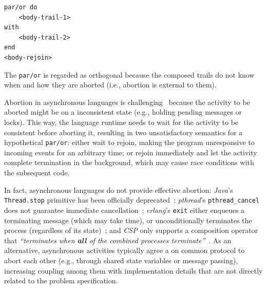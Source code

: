 \documentclass{acm_proc_article-sp}
\newcommand{\code}[1] {{\small{\texttt{#1}}}}
\newcommand{\1}{\;}
\newcommand{\2}{\;\;}
\newcommand{\3}{\;\;\;}
\newcommand{\5}{\;\;\;\;\;}
\begin{document}
\begin{lstlisting}
par/or do
    <body-trail-1>
with
    <body-trail-2>
end
<body-rejoin>
\end{lstlisting}

The \code{par/or} is regarded as orthogonal because the composed trails do not 
know when and how they are aborted (i.e., abortion is external to them).
%


Abortion in asynchronous languages is challenging~\cite{esterel.preemption} 
because the activity to be aborted might be on a inconsistent state (e.g., 
holding pending messages or locks).
%
This way, the language runtime needs to wait for the activity to be consistent 
before aborting it, resulting in two unsatisfactory semantics for a 
hypothetical \code{par/or}:
either wait to rejoin, making the program unresponsive to incoming events for 
an arbitrary time;
or rejoin immediately and let the activity complete termination in the 
background, which may cause race conditions with the subsequent code.

In fact, asynchronous languages do not provide effective abortion:
\emph{Java}'s \code{Thread.stop} primitive has been officially 
deprecated~\cite{sync_async.threadsstop};
\emph{pthread}'s \code{pthread\_cancel} does not guarantee immediate 
cancellation~\cite{sync_async.pthreadsstop};
\emph{erlang}'s \code{exit} either enqueues a terminating message (which may 
take time), or unconditionally terminates the process (regardless of its 
state)~\cite{sync_async.erlangstop};
and \emph{CSP} only supports a composition operator that \emph{``terminates 
when \textbf{all} of the combined processes terminate''}~\cite{async.csp}.
%
As an alternative, asynchronous activities typically agree a on common protocol 
to abort each other (e.g., through shared state variables or message passing), 
increasing coupling among them with implementation details that are not 
directly related to the problem specification.
\end{document}
